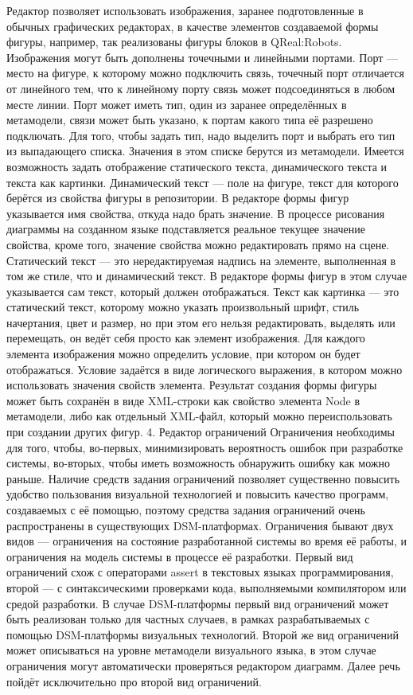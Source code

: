 	Редактор позволяет использовать изображения, заранее подготовленные в обычных графических редакторах, в качестве элементов создаваемой формы фигуры, например, так реализованы фигуры блоков в QReal:Robots. 
Изображения могут быть дополнены точечными и линейными портами. Порт --- место на фигуре, к которому можно подключить связь, точечный порт отличается от линейного тем, что к линейному порту связь может подсоединяться в любом месте линии. Порт может иметь тип, один из заранее определённых в метамодели, связи может быть указано, к портам какого типа её разрешено подключать. Для того, чтобы задать тип, надо выделить порт и выбрать его тип из выпадающего списка. Значения в этом списке берутся из метамодели.
Имеется возможность задать отображение статического текста, динамического текста и текста как картинки. Динамический текст --- поле на фигуре, текст для которого берётся из свойства фигуры в репозитории. В редакторе формы фигур указывается имя свойства, откуда надо брать значение. В процессе рисования диаграммы на созданном языке подставляется реальное текущее значение свойства, кроме того, значение свойства можно редактировать прямо на сцене. Статический текст --- это нередактируемая надпись на элементе, выполненная в том же стиле, что и динамический текст. В редакторе формы фигур в этом случае указывается сам текст, который должен отображаться. Текст как картинка --- это статический текст, которому можно указать произвольный шрифт, стиль начертания, цвет и размер, но при этом его нельзя редактировать, выделять или перемещать, он ведёт себя просто как элемент изображения.
Для каждого элемента изображения можно определить условие, при котором он будет отображаться. Условие задаётся в виде логического выражения, в котором можно использовать значения свойств элемента. 
Результат создания формы фигуры может быть сохранён в виде XML-строки как свойство элемента Node в метамодели, либо как отдельный XML-файл, который можно переиспользовать при создании других фигур.
4. Редактор ограничений
	Ограничения необходимы для того, чтобы, во-первых, минимизировать вероятность ошибок при разработке системы, во-вторых, чтобы иметь возможность обнаружить ошибку как можно раньше. Наличие средств задания ограничений позволяет существенно повысить удобство пользования визуальной технологией и повысить качество программ, создаваемых с её помощью, поэтому средства задания ограничений очень распространены в существующих DSM-платформах. 
Ограничения бывают двух видов --- ограничения на состояние разработанной системы во время её работы, и ограничения на модель системы в процессе её разработки. Первый вид ограничений схож с операторами assert в текстовых языках программирования, второй --- с синтаксическими проверками кода, выполняемыми компилятором или средой разработки. В случае DSM-платформы первый вид ограничений может быть реализован только для частных случаев, в рамках разрабатываемых с помощью DSM-платформы визуальных технологий. Второй же вид ограничений может описываться на уровне метамодели визуального языка, в этом случае ограничения могут автоматически проверяться редактором диаграмм. Далее речь пойдёт исключительно про второй вид ограничений.
